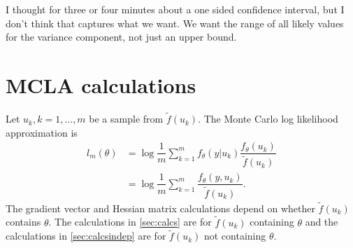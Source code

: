 \documentclass{article}
\begin{document}
I thought for three or four minutes about a one sided confidence interval, but I don't think that captures what we want. We want the range of all likely values for the variance component, not just an upper bound.

%
%
%
%
%







\appendix
\section{MCLA calculations}
Let $u_k,k=1,\ldots,m$ be a sample from $\tilde{f}(u_k)$. The Monte Carlo log likelihood approximation is
\begin{align}
l_{m}(\theta) &=\log \dfrac{1}{m} \sum_{k=1}^mf_\theta(y|u_k)  \dfrac{ f_\theta(u_k)   }{\tilde{f}(u_k)}\\
&= \log \dfrac{1}{m} \sum_{k=1}^m  \dfrac{ f_\theta(y,u_k)   }{\tilde{f}(u_k)}.
\end{align}
The gradient vector and Hessian matrix calculations depend on whether $\tilde{f}(u_k)$ contains $\theta$. The calculations in \ref{sec:calcs} are for $\tilde{f}(u_k)$ containing $\theta$ and the calculations in \ref{sec:calcsindep} are for $\tilde{f}(u_k)$ not containing $\theta$.
\end{document}
